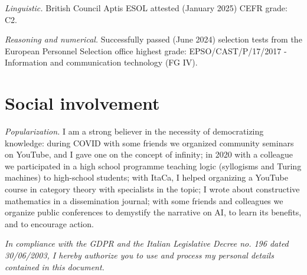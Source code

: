 \documentclass[a4paper,10pt]{article}
\begin{document}
\textit{Linguistic.} British Council Aptis ESOL attested (January 2025) CEFR grade: C2.

\textit{Reasoning and numerical.} Successfully passed (June 2024) selection tests from the European Personnel Selection office highest grade: EPSO/CAST/P/17/2017 - Information and communication technology (FG IV).


	
\section*{ Social involvement}


\textit{Popularization.} I am a strong believer in the necessity of democratizing knowledge: during COVID with some friends we organized community seminars on YouTube, and I gave one on the concept of infinity; in 2020 with a colleague we participated in a high school programme teaching logic (syllogisms and Turing machines) to high-school students; with ItaCa, I helped organizing a YouTube course in category theory with specialists in the topic; I wrote about constructive mathematics in a dissemination journal; with some friends and colleagues we organize public conferences to demystify the narrative on AI, to learn its benefits, and to encourage action.




\vfill


\footnotesize\textit{In compliance with the GDPR and the Italian Legislative Decree no. 196 dated 30/06/2003, I hereby authorize you to use and process my personal details contained in this document.}
\end{document}
